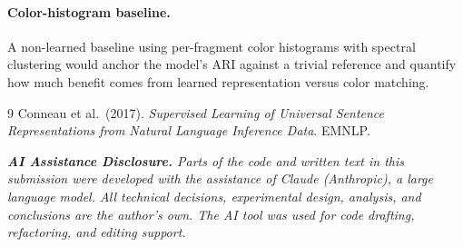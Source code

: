 \documentclass[10pt, a4paper, twocolumn]{article}
\begin{document}
\paragraph{Color-histogram baseline.}
A non-learned baseline using per-fragment color histograms with spectral
clustering would anchor the model's ARI against a trivial reference and
quantify how much benefit comes from learned representation versus color
matching.

\begin{thebibliography}{9}\small
{}
Conneau et al.\ (2017). \textit{Supervised Learning of Universal Sentence
Representations from Natural Language Inference Data}. EMNLP.
\end{thebibliography}

\vspace{6pt}
\noindent\small\textit{\textbf{AI Assistance Disclosure.} Parts of the code
and written text in this submission were developed with the assistance of
Claude (Anthropic), a large language model. All technical decisions,
experimental design, analysis, and conclusions are the author's own. The AI
tool was used for code drafting, refactoring, and editing support.}
\end{document}
